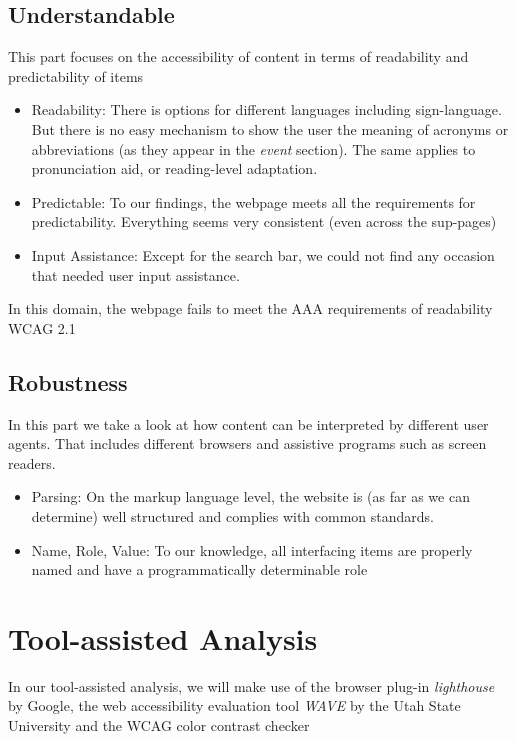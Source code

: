 \subsection*{Understandable}
This part focuses on the accessibility of content in terms of readability and predictability of items
\begin{itemize}
	\item Readability: There is options for different languages including sign-language. But there is no easy mechanism to show the user the meaning of acronyms or abbreviations (as they appear in the \textsl{event} section). The same applies to pronunciation aid, or reading-level adaptation.
	\item Predictable: To our findings, the webpage meets all the requirements for predictability. Everything seems very consistent (even across the sup-pages)
	\item Input Assistance: Except for the search bar, we could not find any occasion that needed user input assistance. 
\end{itemize}
In this domain, the webpage fails to meet the AAA requirements of readability WCAG 2.1
\subsection*{Robustness}
In this part we take a look at how content can be interpreted by different user agents. That includes different browsers and assistive programs such as screen readers.
\begin{itemize}
	\item Parsing: On the markup language level, the website is (as far as we can determine) well structured and complies with common standards.
	\item Name, Role, Value: To our knowledge, all interfacing items are properly named and have a programmatically determinable role
\end{itemize}

\section{Tool-assisted Analysis}
In our tool-assisted analysis, we will make use of the browser plug-in \textsl{lighthouse} by Google, the web accessibility evaluation tool \textsl{WAVE} by the Utah State University and the WCAG color contrast checker 

